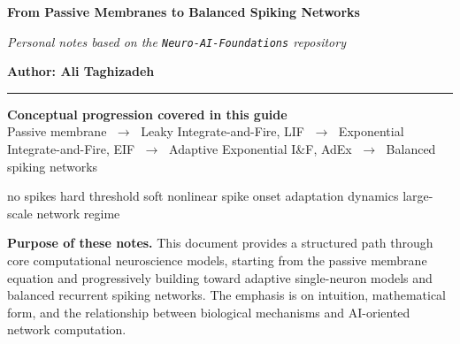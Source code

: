 \documentclass[11pt,a4paper]{article}
\title{}
\author{}
\date{}
\newcommand{\GuideTitle}{From Passive Membranes to Balanced Spiking Networks}
\newcommand{\GuideSource}{Personal notes based on the \texttt{Neuro-AI-Foundations} repository}
\newcommand{\GuideAuthor}{Ali Taghizadeh}
\begin{document}
	
	\begin{center}
		\vspace*{-1.2cm}
		
		{\Huge\bfseries\color{navy}\GuideTitle\par}
		

		
		
		\vspace{0.35cm}
		
		{\normalsize\itshape\color{midgray}\GuideSource\par}
		
		\vspace{0.45cm}
		
		{\large\bfseries Author: \GuideAuthor\par}
		

		
		\vspace{0.45cm}
		
		{\color{navy}\rule{0.82\textwidth}{0.8pt}}
		
		\vspace{0.55cm}
		
		\begin{overviewbox}
			\centering
			\small
			\textbf{Conceptual progression covered in this guide}\\[6pt]
			
			Passive membrane
			$\;\longrightarrow\;$
			Leaky Integrate-and-Fire, LIF
			$\;\longrightarrow\;$
			Exponential Integrate-and-Fire, EIF
			$\;\longrightarrow\;$
			Adaptive Exponential I\&F, AdEx
			$\;\longrightarrow\;$
			Balanced spiking networks
			
			\vspace{5pt}
			
			{\footnotesize
				\color{darkgray}
				no spikes
				\hspace{0.9cm}
				hard threshold
				\hspace{0.8cm}
				soft nonlinear spike onset
				\hspace{0.8cm}
				adaptation dynamics
				\hspace{0.8cm}
				large-scale network regime
			}
		\end{overviewbox}
		
		\vspace{0.45cm}
		
		\begin{tcolorbox}[
			enhanced,
			colback=lightgray,
			colframe=darkgray,
			width=0.94\textwidth,
			arc=3pt,
			boxrule=0.5pt,
			left=8pt,
			right=8pt,
			top=6pt,
			bottom=6pt
			]
			\small
			\textbf{Purpose of these notes.}
			This document provides a structured path through core computational neuroscience models,
			starting from the passive membrane equation and progressively building toward adaptive
			single-neuron models and balanced recurrent spiking networks. The emphasis is on
			intuition, mathematical form, and the relationship between biological mechanisms and
			AI-oriented network computation.
		\end{tcolorbox}
		
	\end{center}
	
\end{document}
